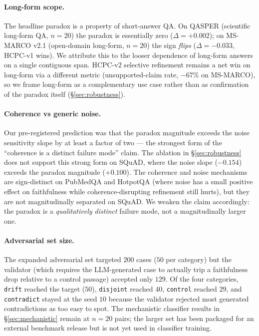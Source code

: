 \paragraph{Long-form scope.}
\label{sec:limitations:longform}
The headline paradox is a property of short-answer QA. On QASPER
(scientific long-form QA, $n=20$) the paradox is essentially zero
($\Delta = +0.002$); on MS-MARCO v2.1 (open-domain long-form, $n=20$)
the sign \emph{flips} ($\Delta = -0.033$, HCPC-v1 wins). We attribute
this to the looser dependence of long-form answers on a single
contiguous span. HCPC-v2 selective refinement remains a net win on
long-form via a different metric (unsupported-claim rate, $-67\%$ on
MS-MARCO), so we frame long-form as a complementary use case rather
than as confirmation of the paradox itself
(\S\ref{sec:robustness}).

\paragraph{Coherence vs generic noise.}
\label{sec:limitations:noise}
Our pre-registered prediction was that the paradox magnitude exceeds
the noise sensitivity slope by at least a factor of two — the strongest
form of the ``coherence is a distinct failure mode'' claim. The
ablation in \S\ref{sec:robustness} does not support this strong form on
SQuAD, where the noise slope ($-0.154$) exceeds the paradox magnitude
($+0.100$). The coherence and noise mechanisms are sign-distinct on
PubMedQA and HotpotQA (where noise has a small positive effect on
faithfulness while coherence-disrupting refinement still hurts), but
they are not magnitudinally separated on SQuAD. We weaken the claim
accordingly: the paradox is a \emph{qualitatively distinct} failure
mode, not a magnitudinally larger one.

\paragraph{Adversarial set size.}
\label{sec:limitations:adversarial}
The expanded adversarial set targeted $200$ cases ($50$ per category)
but the validator (which requires the LLM-generated case to actually
trip a faithfulness drop relative to a control passage) accepted only
$129$. Of the four categories, \texttt{drift} reached the target
($50$), \texttt{disjoint} reached $40$, \texttt{control} reached $29$,
and \texttt{contradict} stayed at the seed $10$ because the validator
rejected most generated contradictions as too easy to spot. The
mechanistic classifier results in \S\ref{sec:mechanistic} remain at
$n=20$ pairs; the larger set has been packaged for an external
benchmark release but is not yet used in classifier training.

